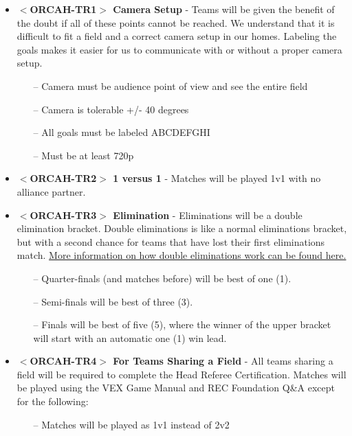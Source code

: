 \documentclass[letterpaper, 12pt]{article}
\begin{document}
\begin{itemize}[label={}]
\item\textbf{$<$ORCAH-TR1$>$ Camera Setup} - Teams will be given the benefit of the doubt if all of these points cannot be reached.  We understand that it is difficult to fit a field and a correct camera setup in our homes.  Labeling the goals makes it easier for us to communicate with or without a proper camera setup.
\begin{itemize}
\item[--] Camera must be audience point of view and see the entire field
\item[--] Camera is tolerable +/- 40 degrees
\item[--] All goals must be labeled ABCDEFGHI
\item[--] Must be at least 720p
\end{itemize}

\item\textbf{$<$ORCAH-TR2$>$ 1 versus 1} - Matches will be played 1v1 with no alliance partner. 

\item\textbf{$<$ORCAH-TR3$>$ Elimination} - Eliminations will be a double elimination bracket.  Double eliminations is like a normal eliminations bracket, but with a second chance for teams that have lost their first eliminations match. \href{https://en.wikipedia.org/wiki/Double-elimination_tournament}{More information on how double eliminations work can be found here.}

\begin{itemize}
\item[--] Quarter-finals (and matches before) will be best of one (1).
\item[--] Semi-finals will be best of three (3).
\item[--] Finals will be best of five (5), where the winner of the upper bracket will start with an automatic one (1) win lead.
\end{itemize}

\item\textbf{$<$ORCAH-TR4$>$ For Teams Sharing a Field} - All teams sharing a field will be required to complete the Head Referee Certification.  Matches will be played using the VEX Game Manual and REC Foundation Q\&A except for the following:
\begin{itemize}
\item[--] Matches will be played as 1v1 instead of 2v2
\end{itemize}



\end{itemize}
\end{document}
